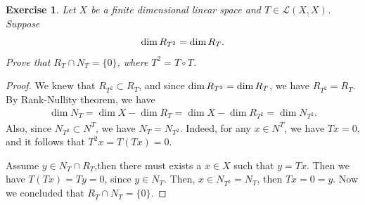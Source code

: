 \documentclass[10pt]{book}
\newtheorem{exercise}{Exercise}[section]
\theoremstyle{definition}
\numberwithin{equation}{chapter}
\begin{document}
\medskip

\begin{exercise}
Let $X$ be a finite dimensional linear space and $T\in\mathscr{L}(X,X)$. Suppose $${\rm dim}\, R_{T^2} = {\rm dim}\, R_T.$$
Prove that $R_T\cap N_T = \{0\}$, where $T^2 = T\circ T$.
\end{exercise}
\begin{proof}
We knew that $R_{T^2}\subset R_T$, and since ${\rm dim}\, R_{T^2} = {\rm dim}\, R_T$, we have $R_{T^2} = R_T$. By Rank-Nullity theorem, we have
\begin{align*}
    \dim N_T = \dim X - \dim R_T = \dim X - \dim R_{T^2} = \dim N_{T^2}.
\end{align*}
Also, since $N_{T^2} \subset N^T$, we have $N_T = N_{T^2}$. Indeed, for any $x \in N^T$, we have $Tx = 0$, and it follows that $T^2x = T(Tx) = 0$. 

Assume $y\in N_T\cap R_T$,then there must exists a $x\in X$ such that $y = T x$. Then we have $T(Tx) = Ty = 0$, since $y\in N_T$. Then, $x\in N_{T^2} = N_T$, then $Tx = 0 = y$. Now we concluded that $R_T\cap N_T = \{0\}$.
\end{proof}

\medskip
\end{document}
